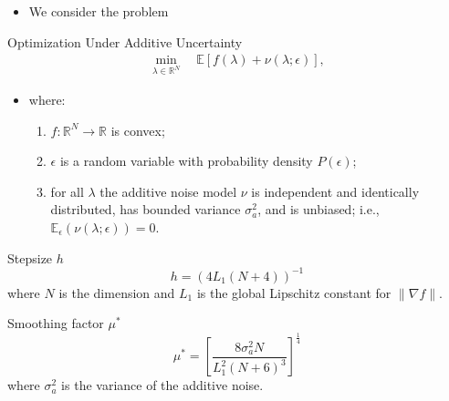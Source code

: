 \documentclass[11pt]{beamer}
\newcommand{\R}{\mathbb{R}}
\begin{document}
\begin{frame}

\begin{itemize}
	
	
	\item We consider the problem

\end{itemize}

\begin{block}{Optimization Under Additive Uncertainty \footnotemark[1]}
\begin{eqnarray} \label{eq:9}
\min_{\lambda \in \R^N} \quad \mathbb{E}\left[f(\lambda)+\nu (\lambda; \epsilon)\right],
\end{eqnarray} 


\begin{itemize}

\item where:

\begin{enumerate}[(i.)]

	\item $f: \R^N \to \R$ is convex;

	\item $\epsilon$ is a random variable with probability density $P(\epsilon)$;

	\item for all $\lambda$ the additive noise model $\nu$ is independent and identically distributed, has bounded variance $\sigma_a^2$, and is unbiased; i.e., $\mathbb{E}_\epsilon (\nu(\lambda;\epsilon))=0$.

\end{enumerate}


\end{itemize}


\end{block}


\end{frame}

\begin{frame}
\begin{block}{Stepsize $h$}
$$
h = (4L_1(N+4))^{-1}
$$
where $N$ is the dimension and $L_1$ is the global Lipschitz constant for $\| \nabla f \|$.
\end{block}

\begin{block}{Smoothing factor $\mu^*$}
$$
\mu^* = \left [ \frac{8 \sigma_a^2 N}{L_1^2(N+6)^3} \right] ^{\frac{1}{4}}
$$
where $\sigma_a^2$ is the variance of the additive noise.
\end{block}

\end{frame}
\end{document}
